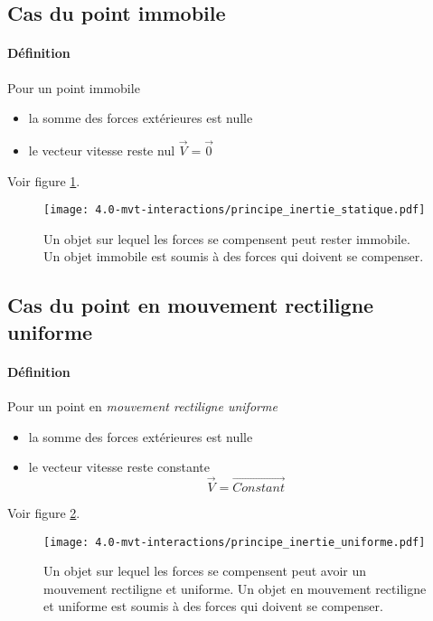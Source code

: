 \subsection{Cas du point immobile}
\paragraph{Définition}
Pour un point immobile
\begin{itemize}
 \item la somme des forces extérieures est nulle
 \item le vecteur vitesse reste nul $\overrightarrow{V} = \overrightarrow{0}$
\end{itemize}
Voir figure \ref{fig:principe_inertie_statique}.
\begin{figure}[h!]
  \begin{center}
      \texttt{[image: 4.0-mvt-interactions/principe\_inertie\_statique.pdf]}
  \end{center}
  \caption{Un objet sur lequel les forces se compensent peut rester immobile. Un objet  immobile est soumis à des forces qui doivent se compenser.}
  \label{fig:principe_inertie_statique}
\end{figure}

\subsection{Cas du point en mouvement rectiligne uniforme}
\paragraph{Définition}
Pour un point en \textit{mouvement rectiligne uniforme}
\begin{itemize}
 \item la somme des forces extérieures est nulle
 \item le vecteur vitesse reste constante $$\overrightarrow{V} = \overrightarrow{Constant}$$
\end{itemize}
Voir figure \ref{fig:principe_inertie_uniforme}.
\begin{figure}[h!]
  \begin{center}
      \texttt{[image: 4.0-mvt-interactions/principe\_inertie\_uniforme.pdf]}
  \end{center}
  \caption{Un objet sur lequel les forces se compensent peut avoir un mouvement rectiligne et uniforme. Un objet en mouvement rectiligne et uniforme est soumis à des forces qui doivent se compenser.}
  \label{fig:principe_inertie_uniforme}
\end{figure}


